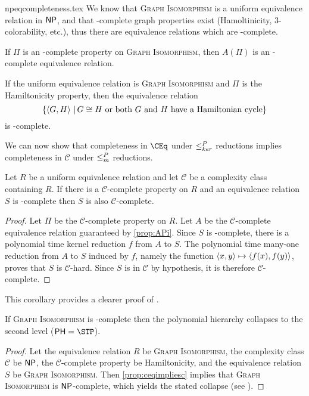 \begin{filecontents}{npeqcompleteness.tex}
We know that \textsc{Graph Isomorphism} is a uniform equivalence relation in $\NP$, and that \NP-complete graph properties exist (Hamoltinicity, 3-colorability, etc.), thus there are equivalence relations which are \NP-complete.

\begin{corollary}\label{cor:npcompleteeqrel}
  If $\Pi$ is an \NP-complete property on \textsc{Graph Isomorphism}, then $A(\Pi)$ is an \NP-complete equivalence relation.
\end{corollary}

\begin{example}
  If the uniform equivalence relation is \textsc{Graph Isomorphism} and $\Pi$ is the Hamiltonicity property, then the equivalence relation
  \begin{equation*}
    \{ \pair{G}{H} \, | \, G \cong H \text{ or both } G \text{ and } H \text{ have a Hamiltonian cycle}  \}
  \end{equation*}
  is \NP-complete.
\end{example}

We can now show that completeness in $\CEq$ under $\kr$ reductions implies completeness in $\mathcal{C}$ under $\mor$ reductions.

\begin{proposition}\label{prop:ceqimpliesc}
  Let $R$ be a uniform equivalence relation and let $\mathcal{C}$ be a complexity class containing $R$.
  If there is a $\mathcal{C}$-complete property on $R$ and an equivalence relation $S$ is \CEq-complete then $S$ is also $\mathcal{C}$-complete.
\end{proposition}
\begin{proof}
  Let $\Pi$ be the $\mathcal{C}$-complete property on $R$.
  Let $A$ be the $\mathcal{C}$-complete equivalence relation guaranteed by \ref{prop:APi}.
  Since $S$ is \CEq-complete, there is a polynomial time kernel reduction $f$ from $A$ to $S$.
  The polynomial time many-one reduction from $A$ to $S$ induced by $f$, namely the function $\pair{x}{y} \mapsto \pair{f(x)}{f(y)}$, proves that $S$ is $\mathcal{C}$-hard.
  Since $S$ is in $\mathcal{C}$ by hypothesis, it is therefore $\mathcal{C}$-complete.
\end{proof}

This corollary provides a clearer proof of \cite[Proposition~8.1]{bcffm}.

\begin{corollary}
  If \textsc{Graph Isomorphism} is \NPEq-complete then the polynomial hierarchy collapses to the second level ($\PH = \STP$).
\end{corollary}
\begin{proof}
  Let the equivalence relation $R$ be \textsc{Graph Isomorphism}, the complexity class $\mathcal{C}$ be $\NP$, the $\mathcal{C}$-complete property be Hamiltonicity, and the equivalence relation $S$ be \textsc{Graph Isomorphism}.
  Then \ref{prop:ceqimpliesc} implies that \textsc{Graph Isomorphism} is $\NP$-complete, which yields the stated collapse (see \cite{schoning87}).
\end{proof}


\end{filecontents}
